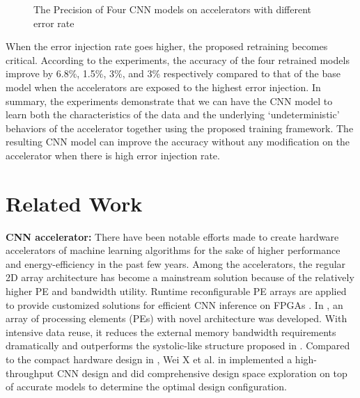 \begin{figure*}
        \center
        \qquad
        \qquad
        \qquad
        \caption{The Precision of Four CNN models on accelerators with different error rate}
        \label{fig:softerror accuracy}
\end{figure*}


  When the error injection rate goes higher, the proposed retraining becomes critical. 
According to the experiments, the accuracy of the four retrained models improve by 6.8\%, 1.5\%, 3\%, and 3\% 
respectively compared to that of the base model when the accelerators are exposed to the highest 
error injection. In summary, the experiments demonstrate that we can have the CNN model to learn 
both the characteristics of the data and the underlying ‘undeterministic’ behaviors of the accelerator 
together using the proposed training framework. The resulting CNN model can improve the accuracy 
without any modification on the accelerator when there is high error injection rate.  

\section{Related Work} \label{sec:relatedwork}
\textbf{CNN accelerator:} There have been notable efforts made to create hardware accelerators of 
machine learning algorithms for the sake of higher performance and energy-efficiency \cite{Cnvlutin_25} 
in the past few years. Among the accelerators, the regular 2D array architecture has become 
a mainstream solution because of the relatively higher PE and bandwidth utility. Runtime reconfigurable 
PE arrays are applied to provide customized solutions for efficient CNN inference on FPGAs \cite{Caffeine_6,deepburing_12}. 
In \cite{Aydonat_27}, an array of processing elements (PEs) with novel architecture was developed. With intensive 
data reuse, it reduces the external memory bandwidth requirements dramatically and outperforms 
the systolic-like structure proposed in \cite{Caffeine_6}. Compared to the compact hardware design in \cite{Caffeine_6,Aydonat_27}, 
Wei X et al. in \cite{Wei_29} implemented a high-throughput CNN design and did comprehensive design space exploration 
on top of accurate models to determine the optimal design configuration.

